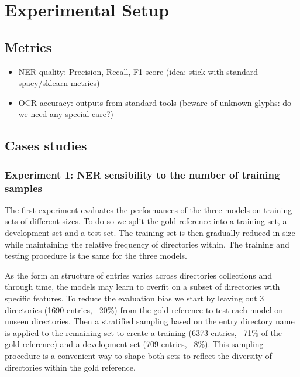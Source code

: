 \section{Experimental Setup}

\subsection{Metrics}
\begin{itemize}
    \item NER quality: Precision, Recall, F1 score (idea: stick with standard spacy/sklearn metrics) 
    \item OCR accuracy: outputs from standard tools (beware of unknown glyphs: do we need any special care?) 
    
\end{itemize}

\subsection{Cases studies}
\subsubsection{Experiment 1: NER sensibility to the number of training samples}
The first experiment evaluates the performances of the three models on training sets of different sizes.
To do so we split the gold reference into a training set, a development set and a test set. The training set is then gradually reduced in size while maintaining the relative frequency of directories within.
The training and testing procedure is the same for the three models.

As the form an structure of entries varies across directories collections and through time, the models may learn to overfit on a subset of directories with specific features.
To reduce the evaluation bias we start by leaving out 3 directories (1690 entries, ~20\%) from the gold reference to test each model on unseen directories.
Then a stratified sampling based on the entry directory name is applied to the remaining set to create a training (6373 entries, ~71\% of the gold reference) and a development set (709 entries, ~8\%).
This sampling procedure is a convenient way to shape both sets to reflect the diversity of directories within the gold reference.

